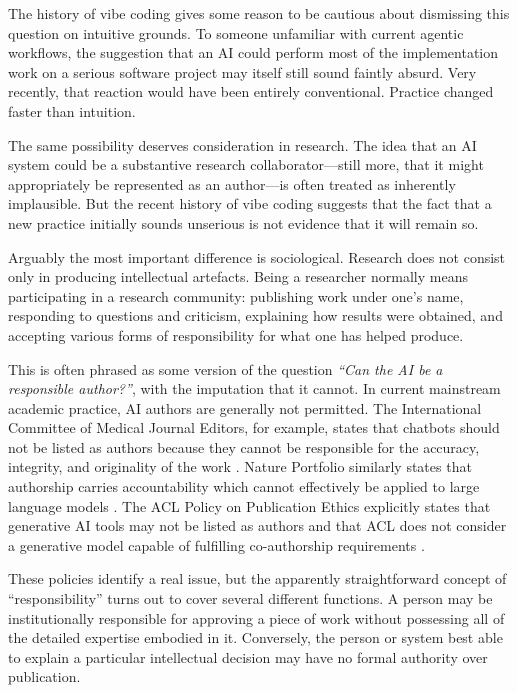 The history of vibe coding gives some reason to be cautious about dismissing this question on intuitive grounds. To someone unfamiliar with current agentic workflows, the suggestion that an AI could perform most of the implementation work on a serious software project may itself still sound faintly absurd. Very recently, that reaction would have been entirely conventional. Practice changed faster than intuition.

The same possibility deserves consideration in research. The idea that an AI system could be a substantive research collaborator---still more, that it might appropriately be represented as an author---is often treated as inherently implausible. But the recent history of vibe coding suggests that the fact that a new practice initially sounds unserious is not evidence that it will remain so.

Arguably the most important difference is sociological. Research does not consist only in producing intellectual artefacts. Being a researcher normally means participating in a research community: publishing work under one's name, responding to questions and criticism, explaining how results were obtained, and accepting various forms of responsibility for what one has helped produce.

This is often phrased as some version of the question \emph{``Can the AI be a responsible author?''}, with the imputation that it cannot. In current mainstream academic practice, AI authors are generally not permitted. The International Committee of Medical Journal Editors, for example, states that chatbots should not be listed as authors because they cannot be responsible for the accuracy, integrity, and originality of the work \citep{icmje2026ai}. Nature Portfolio similarly states that authorship carries accountability which cannot effectively be applied to large language models \citep{nature2026ai}. The ACL Policy on Publication Ethics explicitly states that generative AI tools may not be listed as authors and that ACL does not consider a generative model capable of fulfilling co-authorship requirements \citep{acl2026policy}.

These policies identify a real issue, but the apparently straightforward concept of ``responsibility'' turns out to cover several different functions. A person may be institutionally responsible for approving a piece of work without possessing all of the detailed expertise embodied in it. Conversely, the person or system best able to explain a particular intellectual decision may have no formal authority over publication.

